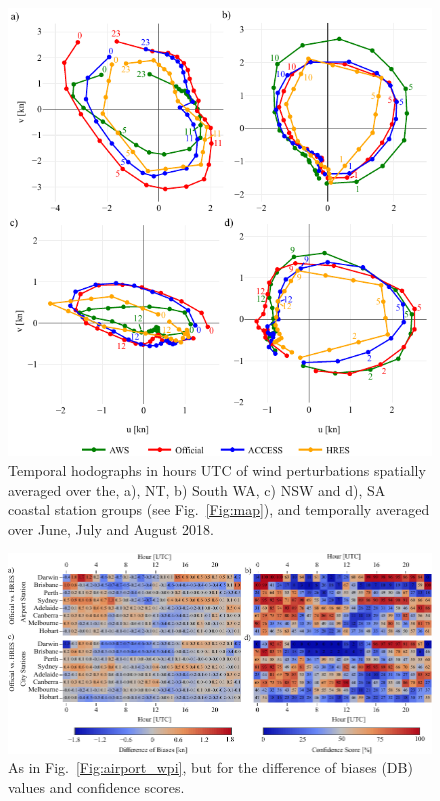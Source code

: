 \documentclass[twocol]{ametsoc}
\begin{document}
\begin{figure}
\centering
\includegraphics[width=33pc]{clim_hodo_alt.pdf}
\caption{Temporal hodographs in hours UTC of wind perturbations spatially averaged over the, a), NT, b) South WA, c) NSW and d), SA coastal station groups (see Fig.~\ref{Fig:map}), and temporally averaged over June, July and August 2018.}
\label{Fig:clim_hodo}
\end{figure}

\begin{figure}
\centering
\includegraphics[width=39pc]{airport_cwpi.pdf}
\caption{As in Fig.~\ref{Fig:airport_wpi}, but for the difference of biases (DB) values and confidence scores.}
\label{Fig:airport_cwpi}
\end{figure}
\end{document}
